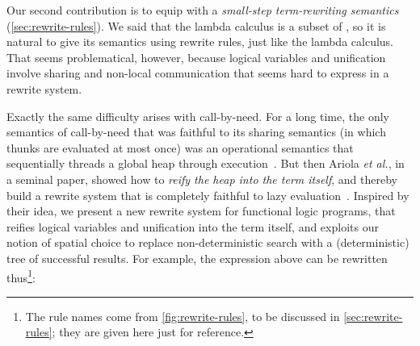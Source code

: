 \documentclass[acmsmall,review,anonymous,dvipsnames]{acmart}
\newcommand{\etal}{\emph{et al.}}
\begin{document}
Our second contribution is to equip \versecalc{} with a
\emph{small-step term-rewriting semantics} (\cref{sec:rewrite-rules}).
We said that the lambda calculus is a subset of \versecalc{}, so it is natural to give its
semantics using rewrite rules, just like the lambda calculus.  That seems problematical, however, because
logical variables and unification involve sharing and non-local communication that seems hard
to express in a rewrite system.

Exactly the same difficulty arises with call-by-need.  For a long time, the only semantics of
call-by-need that was faithful to its sharing semantics (in which thunks are evaluated at most once)
was an operational semantics that sequentially threads a global heap through execution~\cite{launchbury:natural}.
But then Ariola {\etal}, in a seminal paper, showed how to \emph{reify the heap into the term itself},
and thereby build a rewrite system that is completely faithful to lazy evaluation~\cite{ariola:call-by-need}.
Inspired by their idea, we present a new rewrite system for functional logic programs, that reifies
logical variables and unification into the term itself,
and exploits our notion of spatial choice to replace non-deterministic
search with a (deterministic) tree of successful results.
For example, the expression above can be rewritten
thus\footnote{The rule names come from \cref{fig:rewrite-rules}, to be discussed in \cref{sec:rewrite-rules}; they
  are given here just for reference.}:
\end{document}
